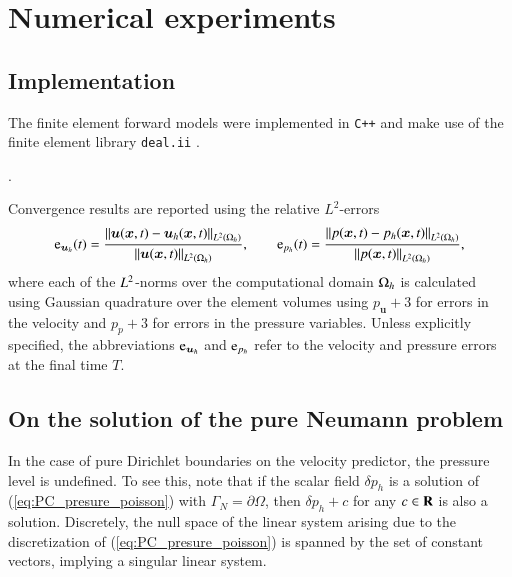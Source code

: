 \section{Numerical experiments}
\label{sec:numerical_experiments}

\subsection{Implementation}%
\label{sec:implementation_details}

The finite element forward models were implemented in \texttt{C++} and make use of the finite element library \texttt{deal.ii} \cite{dealII93}.

. 

Convergence results are reported using the relative $L^2$-errors 
\begin{equation}
  \text{e}_{\bm{u}_h}(t) = \frac{ \left\lVert \bm{u}(\bm{x}, t) - \bm{u}_h(\bm{x}, t)\right\rVert_{L^2(\Omega_h)} }{ \left\lVert \bm{u}(\bm{x}, t) \right\rVert_{L^2(\Omega_h)} }, \qquad 
  \text{e}_{p_h}(t) =\frac{ \left\lVert p(\bm{x}, t) - p_h(\bm{x}, t)\right\rVert_{L^2(\Omega_h)} }{ \left\lVert p(\bm{x}, t) \right\rVert_{L^2(\Omega_h)} },
\end{equation}
where each of the $L^2$-norms over the computational domain $\Omega_h$ is calculated using Gaussian quadrature over the element volumes using $p_{\bm{u}} + 3$ for errors in the velocity and $p_{p} + 3$ for errors in the pressure variables.
Unless explicitly specified, the abbreviations $\text{e}_{\bm{u}_h}$ and $\text{e}_{p_h}$ refer to the velocity and pressure errors at the final time $T$.


\subsection{On the solution of the pure Neumann problem}

In the case of pure Dirichlet boundaries on the velocity predictor, the pressure level is undefined. 
To see this, note that if the scalar field $\delta p_h$ is a solution of (\ref{eq:PC_presure_poisson}) with $\Gamma_N = \partial \Omega$, then $\delta p_h + c$ for any $c \in {\mbox{\bf R}}$ is also a solution. 
Discretely, the null space of the linear system arising due to the discretization of (\ref{eq:PC_presure_poisson}) is spanned by the set of constant vectors, implying a singular linear system.


